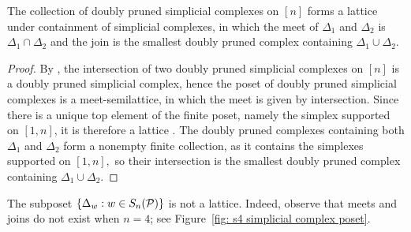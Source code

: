 \begin{corollary}\label{cor: lattice}
    The collection of doubly pruned simplicial complexes on $[n]$ forms a lattice under containment of simplicial complexes, in which the meet of $\Delta_1$ and $\Delta_2$ is $\Delta_1\cap\Delta_2$ and the join is the smallest doubly pruned complex containing $\Delta_1\cup\Delta_2.$
\end{corollary}

\begin{proof}
    By , the intersection of two doubly pruned simplicial complexes on $[n]$ is a doubly pruned simplicial complex, hence the poset of doubly pruned simplicial complexes is a meet-semilattice, in which the meet is given by intersection. Since there is a unique top element of the finite poset, namely the simplex supported on $[1,n]$, it is therefore a lattice \cite[Prop.~3.3.1]{StanleyEC1}. 
    The doubly pruned complexes containing both $\Delta_1$ and $\Delta_2$ form a nonempty finite collection, as it contains the simplexes supported on $[1,n],$ so their intersection is the smallest doubly pruned complex containing $\Delta_1\cup\Delta_2.$
\end{proof}

\begin{remark}
    The subposet $\{\Delta_w : w\in S_n(\mathcal{P})\}$ is not a lattice. Indeed, observe that meets and joins do not exist when $n=4$; see Figure~\ref{fig: s4 simplicial complex poset}.
\end{remark}

